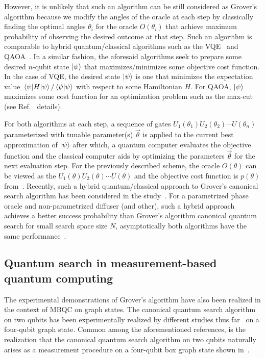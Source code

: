 \bigskip
\noindent
However, it is unlikely that such an algorithm can be still considered as Grover's algorithm because we modify the angles of the oracle at each step by classically finding the optimal angles $\theta_i$ for the oracle $O(\theta_i)$ that achieve maximum probability of observing the desired outcome at that step. Such an algorithm is comparable to hybrid quantum/classical algorithms such as the \gls{VQE}~\cite{Peruzzo_2014} and \gls{QAOA}~\cite{Farhi_2014}. In a similar fashion, the aforesaid algorithms seek to prepare some desired $n$-qubit state $\ket{\psi}$ that maximizes/minimizes some objective cost function. In the case of \acs{VQE}, the desired state $\ket{\psi}$ is one that minimizes the expectation value $\expval{H}{\psi}/\ip{\psi}$ with respect to some Hamiltonian $H$. For \acs{QAOA},  $\ket{\psi}$ maximizes some cost function for an optimization problem such as the \acs{max-cut} (see Ref.~\cite{Farhi_2014} details). 

\bigskip
\noindent
For both algorithms at each step, a sequence of gates $U_1(\theta_1)U_2(\theta_2)\cdots U(\theta_n)$ parameterized with tunable parameter(s) $\vec{\theta}$ is applied to the current best approximation of $\ket{\psi}$ after which, a quantum computer evaluates the objective function and the classical computer aids by optimizing the parameters $\vec{\theta}$ for the next evaluation step. For the previously described scheme, the oracle $O(\theta)$ can be viewed as the $U_1(\theta)U_2(\theta)\cdots U(\theta)$ and the objective cost function is $p(\theta)$ from~. Recently, such a hybrid quantum/classical approach to Grover's canonical search algorithm has been considered in the study~\cite{Morales_2018}. For a parametrized phase oracle and non-parametrized diffuser (and other), such a hybrid approach achieves a better success probability than Grover's algorithm canonical quantum search for small search space size $N$, asymptotically both algorithms have the same performance~\cite{Morales_2018}.

\subsection{Quantum search in measurement-based quantum computing}

The experimental demonstrations of Grover's algorithm have also been realized in the context of \gls{MBQC} on graph states. The canonical quantum search algorithm on two qubits has been experimentally realized by different studies thus far~\cite{Walther_2005,Prevedel_2007,Chen_2007,Barz_2012} on a four-qubit graph state. Common among the aforementioned references, is the realization that the canonical quantum search algorithm on two qubits naturally arises as a measurement procedure on a four-qubit box graph state shown in~.

